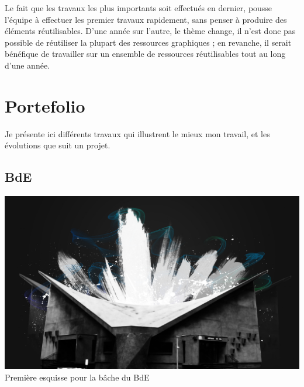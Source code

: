         Le fait que les travaux les plus importants soit effectués en dernier, pousse l'équipe à effectuer les premier travaux rapidement, sans penser à produire des éléments réutilisables.
        D'une année sur l'autre, le thème change, il n'est donc pas possible de réutiliser la plupart des ressources graphiques ; en revanche, il serait bénéfique de travailler sur un ensemble de ressources réutilisables tout au long d'une année.

\newpage

\section{Portefolio}

    Je présente ici différents travaux qui illustrent le mieux mon travail, et les évolutions que suit un projet.
    \subsection{BdE}
        \begin{center}
            \includegraphics[width=\textwidth]{img/amphi.jpg}\\
            Première esquisse pour la bâche du BdE
        \end{center}

